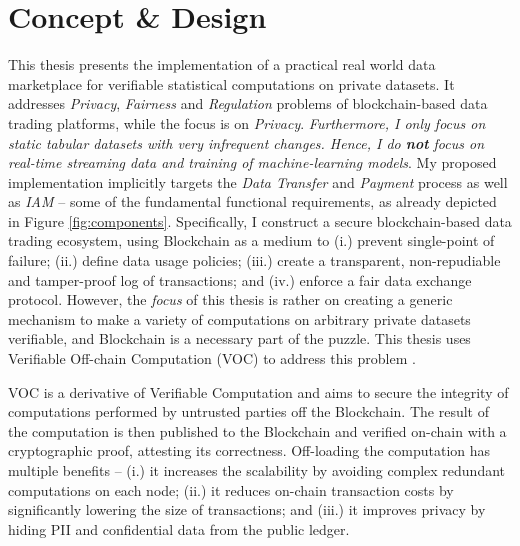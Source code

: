 \chapter{Concept \& Design}
\label{cha:cod}

This thesis presents the implementation of a practical real world data marketplace for verifiable statistical computations on private datasets. It addresses \emph{Privacy}, \emph{Fairness} and \emph{Regulation} problems of blockchain-based data trading platforms, while the focus is on \emph{Privacy}. \emph{Furthermore, I only focus on static tabular datasets with very infrequent changes. Hence, I do \textbf{not} focus on real-time streaming data and training of machine-learning models}. My proposed implementation implicitly targets the \emph{Data Transfer} and \emph{Payment} process as well as \emph{IAM} -- some of the fundamental functional requirements, as already depicted in Figure \ref{fig:components}. Specifically, I construct a secure blockchain-based data trading ecosystem, using Blockchain as a medium to (i.) prevent single-point of failure; (ii.) define data usage policies; (iii.) create a transparent, non-repudiable and tamper-proof log of transactions; and (iv.) enforce a fair data exchange protocol. However, the \emph{focus} of this thesis is rather on creating a generic mechanism to make a variety of computations on arbitrary private datasets verifiable, and Blockchain is a necessary part of the puzzle. This thesis uses Verifiable Off-chain Computation (VOC) to address this problem \cite{eberhardtOffchainingModelsApproaches2018,eberhardtBlockchainInsightsOffChaining2017}.

VOC is a derivative of Verifiable Computation and aims to secure the integrity of computations performed by untrusted parties off the Blockchain. The result of the computation is then published to the Blockchain and verified on-chain with a cryptographic proof, attesting its correctness. Off-loading the computation has multiple benefits -- (i.) it increases the scalability by avoiding complex redundant computations on each node; (ii.) it reduces on-chain transaction costs by significantly lowering the size of transactions; and (iii.) it improves privacy by hiding PII and confidential data from the public ledger. \cite{eberhardtOffchainingModelsApproaches2018,eberhardtZoKratesScalablePrivacyPreserving2018a,simunicVerifiableComputingApplications2021,xuSlimChainScalingBlockchain} 

